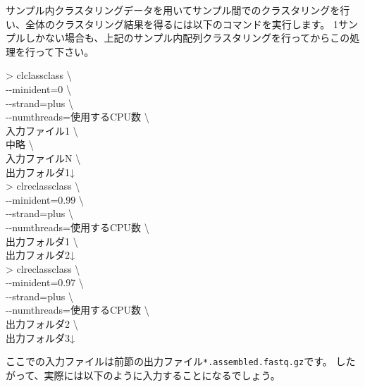 \documentclass[titlepage,10pt,a4paper]{jsbook}
\newenvironment{cmd}{\begin{oframed}\raggedright\ttfamily\footnotesize\setlength{\baselineskip}{1.4em}}{\end{oframed}\vspace{-1em}}
\begin{document}
サンプル内クラスタリングデータを用いてサンプル間でのクラスタリングを行い、全体のクラスタリング結果を得るには以下のコマンドを実行します。
1サンプルしかない場合も、上記のサンプル内配列クラスタリングを行ってからこの処理を行って下さい。

\begin{cmd}
{\textgreater} clclassclass {\textbackslash}\\
{-}{-}minident=0 {\textbackslash}\\
{-}{-}strand=plus {\textbackslash}\\
{-}{-}numthreads=使用するCPU数 {\textbackslash}\\
入力ファイル1 {\textbackslash}\\
中略 {\textbackslash}\\
入力ファイルN {\textbackslash}\\
出力フォルダ1↓\\
{\textgreater} clreclassclass {\textbackslash}\\
{-}{-}minident=0.99 {\textbackslash}\\
{-}{-}strand=plus {\textbackslash}\\
{-}{-}numthreads=使用するCPU数 {\textbackslash}\\
出力フォルダ1 {\textbackslash}\\
出力フォルダ2↓\\
{\textgreater} clreclassclass {\textbackslash}\\
{-}{-}minident=0.97 {\textbackslash}\\
{-}{-}strand=plus {\textbackslash}\\
{-}{-}numthreads=使用するCPU数 {\textbackslash}\\
出力フォルダ2 {\textbackslash}\\
出力フォルダ3↓
\end{cmd}

ここでの入力ファイルは前節の出力ファイル\texttt{*.assembled.fastq.gz}です。
したがって、実際には以下のように入力することになるでしょう。
\end{document}
